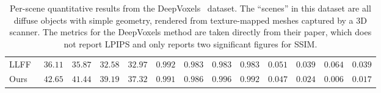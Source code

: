 \begin{table}[t]
{\begin{tabular}{l|cccc|cccc|cccc}
LLFF~\cite{mildenhall19} & $36.11$ & $35.87$ & $32.58$ & $32.97$ & $\mathbf{0.992}$ & $0.983$ & $0.983$ & $0.983$ & $0.051$ & $0.039$ & $0.064$ & $0.039$ \\
Ours       & $\mathbf{42.65}$ & $\mathbf{41.44}$ & $\mathbf{39.19}$ & $\mathbf{37.32}$ & ${0.991}$ & $\mathbf{0.986}$ & $\mathbf{0.996}$ & $\mathbf{0.992}$ & $\mathbf{0.047}$ & $\mathbf{0.024}$ & $\mathbf{0.006}$ & $\mathbf{0.017}$ \\
\end{tabular}
} \vspace{2mm}
\caption{Per-scene quantitative results from the DeepVoxels~\cite{deepvoxels} dataset. The ``scenes'' in this dataset are all diffuse objects with simple geometry, rendered from texture-mapped meshes captured by a 3D scanner. The metrics for the DeepVoxels method are taken directly from their paper, which does not report LPIPS and only reports two significant figures for SSIM.
}
\label{table:suppresults1}  
\end{table}
\setlength{\tabcolsep}{1.4pt}



